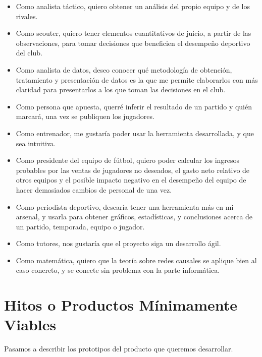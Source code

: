 \begin{itemize}
    \item Como analista táctico, quiero obtener un análisis del propio equipo y de los rivales.
    \item Como scouter, quiero tener elementos cuantitativos de juicio, a partir
      de las observaciones, para tomar decisiones que beneficien el desempeño
      deportivo del club.
    \item Como analista de datos, deseo conocer qué metodología de obtención,
      tratamiento y presentación de datos es la que me permite elaborarlos con
      más claridad para presentarlos a los que toman las decisiones en el club.
    \item Como persona que apuesta, querré inferir el resultado de un partido y 
    quién marcará, una vez se publiquen los jugadores. 
    \item Como entrenador, me gustaría poder usar la herramienta desarrollada, y que sea intuitiva.
    \item \label{hu:presidente} Como presidente del equipo de fútbol, quiero poder calcular los ingresos 
    probables por las ventas de jugadores no deseados, el gasto neto relativo de otros
    equipos y el posible impacto negativo en el desempeño del equipo de hacer demasiados cambios de personal de una 
    vez.  
    \item Como periodista deportivo, desearía tener una herramienta más en mi arsenal, y 
    usarla para obtener gráficos, estadísticas, y conclusiones acerca de un partido, 
    temporada, equipo o jugador.
    \item Como tutores, nos gustaría que el proyecto siga un desarrollo ágil.
    \item Como matemática, quiero que la teoría sobre redes causales se aplique bien al caso concreto, y 
    se conecte sin problema con la parte informática.
\end{itemize}

\section{Hitos o Productos Mínimamente Viables}
Pasamos a describir los prototipos del producto que queremos desarrollar.

